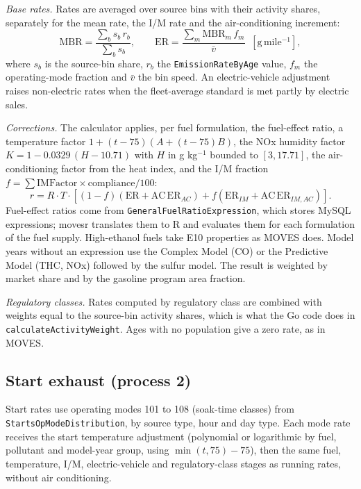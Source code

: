 \documentclass[preprint,
3p]{elsarticle} %
\begin{document}
\emph{Base rates.} Rates are averaged over source bins with their
activity shares, separately for the mean rate, the I/M rate and the
air-conditioning increment: \begin{equation}
\mathrm{MBR} = \frac{\sum_b s_b\,r_b}{\sum_b s_b}, \qquad
\mathrm{ER} = \frac{\sum_m \mathrm{MBR}_m\,f_m}{\bar{v}} \;\; [\mathrm{g\,mile^{-1}}],
\end{equation} where \(s_b\) is the source-bin share, \(r_b\) the
\texttt{EmissionRateByAge} value, \(f_m\) the operating-mode fraction
and \(\bar v\) the bin speed. An electric-vehicle adjustment raises
non-electric rates when the fleet-average standard is met partly by
electric sales.

\emph{Corrections.} The calculator applies, per fuel formulation, the
fuel-effect ratio, a temperature factor \(1 + (t-75)(A + (t-75)B)\), the
NOx humidity factor \(K = 1 - 0.0329\,(H - 10.71)\) with \(H\) in g
kg\(^{-1}\) bounded to \([3, 17.71]\), the air-conditioning factor from
the heat index, and the I/M fraction
\(f = \sum \mathrm{IMFactor}\times\mathrm{compliance}/100\):
\begin{equation}
r = R \cdot T \cdot \left[(1-f)(\mathrm{ER} + \mathrm{AC}\,\mathrm{ER}_{AC}) + f(\mathrm{ER}_{IM} + \mathrm{AC}\,\mathrm{ER}_{IM,AC})\right].
\end{equation} Fuel-effect ratios come from
\texttt{GeneralFuelRatioExpression}, which stores MySQL expressions;
movesr translates them to R and evaluates them for each formulation of
the fuel supply. High-ethanol fuels take E10 properties as MOVES does.
Model years without an expression use the Complex Model (CO) or the
Predictive Model (THC, NOx) followed by the sulfur model. The result is
weighted by market share and by the gasoline program area fraction.

\emph{Regulatory classes.} Rates computed by regulatory class are
combined with weights equal to the source-bin activity shares, which is
what the Go code does in \texttt{calculateActivityWeight}. Ages with no
population give a zero rate, as in MOVES.

\subsection{Start exhaust (process 2)}\label{start-exhaust-process-2}

Start rates use operating modes 101 to 108 (soak-time classes) from
\texttt{StartsOpModeDistribution}, by source type, hour and day type.
Each mode rate receives the start temperature adjustment (polynomial or
logarithmic by fuel, pollutant and model-year group, using
\(\min(t, 75) - 75\)), then the same fuel, temperature, I/M,
electric-vehicle and regulatory-class stages as running rates, without
air conditioning.
\end{document}
